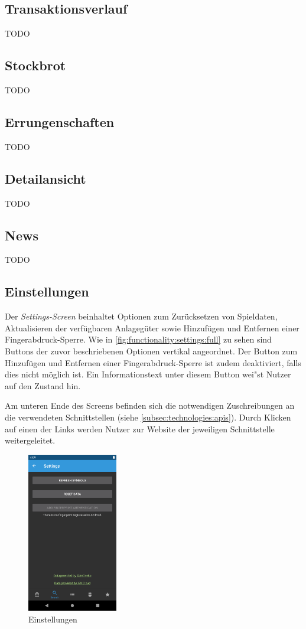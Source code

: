 \documentclass[a4paper]{article}
\begin{document}
\subsection{Transaktionsverlauf}
\label{subsec:functionality:history}
TODO


\subsection{Stockbrot}
\label{subsec:functionality:stockbrot}
TODO


\subsection{Errungenschaften}
\label{subsec:functionality:achievements}
TODO


\subsection{Detailansicht}
\label{subsec:functionality:quote}
TODO


\subsection{News}
\label{subsec:functionality:news}
TODO


\subsection{Einstellungen}
\label{subsec:functionality:settings}
Der \textit{Settings-Screen} beinhaltet Optionen zum Zurücksetzen von Spieldaten, Aktualisieren der verfügbaren Anlagegüter sowie Hinzufügen und Entfernen einer Fingerabdruck-Sperre.
Wie in \autoref{fig:functionality:settings:full} zu sehen sind Buttons der zuvor beschriebenen Optionen vertikal angeordnet.
Der Button zum Hinzufügen und Entfernen einer Fingerabdruck-Sperre ist zudem deaktiviert, falls dies nicht möglich ist.
Ein Informationstext unter diesem Button wei"st Nutzer auf den Zustand hin.

Am unteren Ende des Screens befinden sich die notwendigen Zuschreibungen an die verwendeten Schnittstellen (siehe \autoref{subsec:technologies:apis}).
Durch Klicken auf einen der Links werden Nutzer zur Website der jeweiligen Schnittstelle weitergeleitet.

\begin{figure}[H]
	\centering
	\includegraphics[height=7cm,keepaspectratio]{./images/settings.png}
	\caption{Einstellungen}
	\label{fig:functionality:settings:full}
\end{figure}
\end{document}
